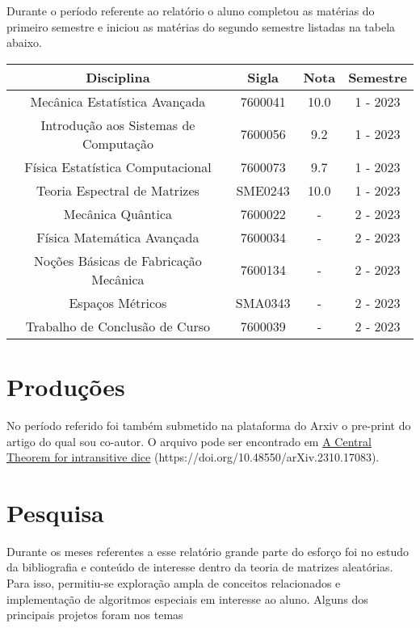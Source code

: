 \documentclass[12pt]{report}
\begin{document}
	Durante o período referente ao relatório o aluno completou as matérias do primeiro semestre e iniciou as matérias do segundo semestre listadas na tabela abaixo.
	
	\hspace{1cm}
	
	\begin{center}
		\begin{tabular}{|c|c|c|c|}
			\hline
			Disciplina & Sigla & Nota & Semestre \\
			\hline
			Mecânica Estatística Avançada & 7600041 & 10.0 & 1 - 2023 \\
			\hline
			Introdução aos Sistemas de Computação & 7600056 & 9.2 & 1 - 2023 \\
			\hline
			Física Estatística Computacional & 7600073 & 9.7 & 1 - 2023 \\
			\hline
			Teoria Espectral de Matrizes & SME0243 & 10.0 & 1 - 2023 \\
			\hline
			Mecânica Quântica & 7600022 & - & 2 - 2023 \\
			\hline
			Física Matemática Avançada & 7600034 & - & 2 - 2023 \\
			\hline
			Noções Básicas de Fabricação Mecânica & 7600134 & - & 2 - 2023 \\
			\hline
			Espaços Métricos & SMA0343 & - & 2 - 2023 \\
			\hline
			Trabalho de Conclusão de Curso & 7600039 & - & 2 - 2023 \\
			\hline
		\end{tabular}
	\end{center}
	
	\section{Produções}
	
	No período referido foi também submetido na plataforma do Arxiv o pre-print do artigo do qual sou co-autor. O arquivo pode ser encontrado em \href{https://doi.org/10.48550/arXiv.2310.17083}{A Central Theorem for intransitive dice} (https://doi.org/10.48550/arXiv.2310.17083).
	
	\section{Pesquisa}
	
	Durante os meses referentes a esse relatório grande parte do esforço foi no estudo da bibliografia e conteúdo de interesse dentro da teoria de matrizes aleatórias. Para isso, permitiu-se exploração ampla de conceitos relacionados e implementação de algoritmos especiais em interesse ao aluno. Alguns dos principais projetos foram nos temas
	
\end{document}
